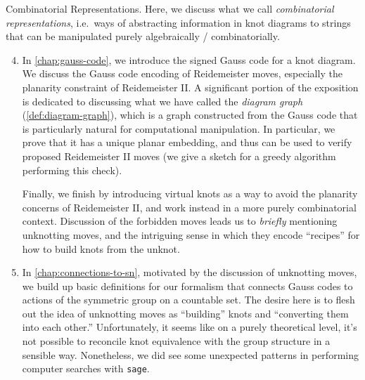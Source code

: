 \begin{enumerate}[label=(\Roman*)]
    Combinatorial Representations. Here, we discuss what we call
    \emph{combinatorial representations}, i.e.\ ways of abstracting
    information in knot diagrams to strings that can be manipulated
    purely algebraically / combinatorially.%
    \begin{enumerate}[label=\arabic*)]
        \setcounter{enumii}{3}
      \item In \cref{chap:gauss-code}, we introduce the signed Gauss
        code for a knot diagram. We discuss the Gauss code encoding of
        Reidemeister moves, especially the planarity constraint of
        Reidemeister II. A significant portion of the exposition is
        dedicated to discussing what we have called the \emph{diagram
        graph} (\cref{def:diagram-graph}), which is a graph
        constructed from the Gauss code that is particularly natural
        for computational manipulation. In particular, we prove that
        it has a unique planar embedding, and thus can be used to
        verify proposed Reidemeister II moves (we give a sketch for a
        greedy algorithm performing this check).

        Finally, we finish by introducing virtual knots as a way to
        avoid the planarity concerns of Reidemeister II, and work
        instead in a more purely combinatorial context. Discussion of
        the forbidden moves leads us to \emph{briefly} mentioning
        unknotting moves, and the intriguing sense in which they
        encode ``recipes'' for how to build knots from the unknot.
      \item In \cref{chap:connections-to-sn}, motivated by the
        discussion of unknotting moves, we build up basic definitions
        for our formalism that connects Gauss codes to actions of the
        symmetric group on a countable set. The desire here is to
        flesh out the idea of unknotting moves as ``building'' knots
        and ``converting them into each other.'' Unfortunately, it
        seems like on a purely theoretical level, it's not possible
        to reconcile knot equivalence with the group structure in a
        sensible way. Nonetheless, we did see some unexpected patterns
        in performing computer searches with \texttt{sage}.


\end{enumerate}
\end{enumerate}
